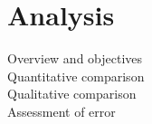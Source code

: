 \chapter{Analysis}

Overview and objectives\\
Quantitative comparison\\
Qualitative comparison\\
Assessment of error\\
